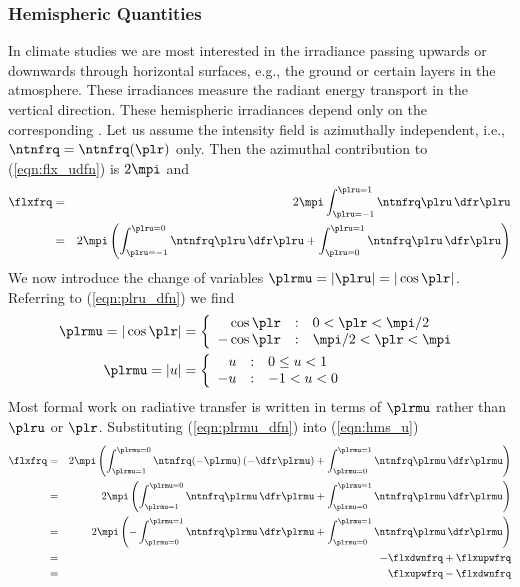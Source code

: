 \documentclass[12pt]{article}
\begin{document}
\subsubsection[Hemispheric Quantities]{Hemispheric Quantities}\label{sxn:flx_hms}
In climate studies we are most interested in the irradiance passing
upwards or downwards through horizontal surfaces, e.g., the ground or
certain layers in the atmosphere. 
These  irradiances measure the radiant energy
transport in the vertical direction.
These hemispheric irradiances depend only on the
corresponding .
Let us assume the intensity field is azimuthally independent, i.e., 
$\ntnfrq = \ntnfrq(\plr)$ only.
Then the azimuthal contribution to (\ref{eqn:flx_udfn}) is $2\mpi$ and
\begin{eqnarray}
\flxfrq & = & 2 \mpi \int_{\plru=-1}^{\plru=1} \ntnfrq \plru \,\dfr\plru \nonumber \\
& = & 2 \mpi \left( 
\int_{\plru=-1}^{\plru=0} \ntnfrq \plru \,\dfr\plru +
\int_{\plru=0}^{\plru=1} \ntnfrq \plru \,\dfr\plru \right)
\label{eqn:hms_u}
\end{eqnarray}
We now introduce the change of variables $\plrmu = |\plru| = |\cos
\plr|$. 
Referring to (\ref{eqn:plru_dfn}) we find
\begin{subequations}
\label{eqn:plrmu_dfn}
\begin{align}
\plrmu =  | \cos \plr | & = \left\{ 
\begin{array}{r@{\quad:\quad}ll}
\cos \plr & 0 < \plr < \mpi/2 \\
-\cos \plr & \mpi/2 < \plr <  \mpi
\end{array} \right. \\
\plrmu =  |u| & = \left\{ 
\begin{array}{r@{\quad:\quad}l}
 u & 0 \le u < 1 \\
-u & -1 < u < 0
\end{array} \right.
\end{align}
\end{subequations}
Most formal work on radiative transfer is written in terms of
$\plrmu$ rather than $\plru$ or $\plr$.
Substituting (\ref{eqn:plrmu_dfn}) into (\ref{eqn:hms_u})
\begin{eqnarray}
\flxfrq & = & 2 \mpi \left( 
\int_{\plrmu=1}^{\plrmu=0} \ntnfrq (-\plrmu) \, (-\dfr\plrmu) +
\int_{\plrmu=0}^{\plrmu=1} \ntnfrq \plrmu \,\dfr\plrmu \right) \nonumber \\
& = & 2 \mpi \left( 
\int_{\plrmu=1}^{\plrmu=0} \ntnfrq \plrmu \,\dfr\plrmu +
\int_{\plrmu=0}^{\plrmu=1} \ntnfrq \plrmu \,\dfr\plrmu \right) \nonumber \\
& = & 2 \mpi \left( 
-\int_{\plrmu=0}^{\plrmu=1} \ntnfrq \plrmu \,\dfr\plrmu +
\int_{\plrmu=0}^{\plrmu=1} \ntnfrq \plrmu \,\dfr\plrmu \right) \nonumber \\
& = & -\flxdwnfrq + \flxupwfrq \nonumber \\
& = & \flxupwfrq - \flxdwnfrq
\end{eqnarray}
\end{document}
